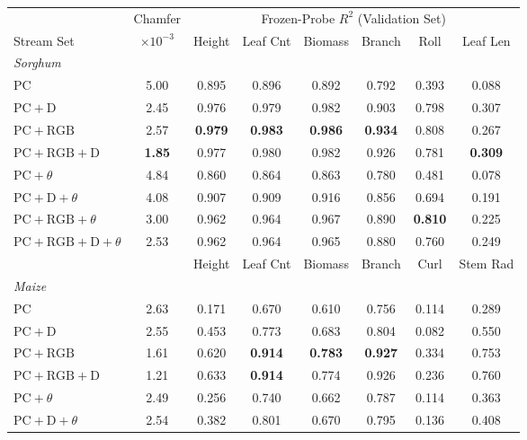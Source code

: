 \begin{table}[t]
  \centering\scriptsize
  \setlength{\tabcolsep}{3.2pt}
  \begin{tabular}{l c cccccc}
    \toprule
    & Chamfer & \multicolumn{6}{c}{Frozen-Probe $R^2$ (Validation Set)} \\
    \cmidrule(lr){3-8}
    Stream Set & $\times10^{-3}$ & Height & Leaf Cnt & Biomass & Branch & Roll & Leaf Len \\
    \midrule
    \multicolumn{8}{l}{\emph{Sorghum}} \\
    PC & 5.00 & 0.895 & 0.896 & 0.892 & 0.792 & 0.393 & 0.088 \\
    $\mathrm{PC}+\mathrm{D}$ & 2.45 & 0.976 & 0.979 & 0.982 & 0.903 & 0.798 & 0.307 \\
    $\mathrm{PC}+\mathrm{RGB}$ & 2.57 & \textbf{0.979} & \textbf{0.983} & \textbf{0.986} & \textbf{0.934} & 0.808 & 0.267 \\
    $\mathrm{PC}+\mathrm{RGB}+\mathrm{D}$ & \textbf{1.85} & 0.977 & 0.980 & 0.982 & 0.926 & 0.781 & \textbf{0.309} \\
    $\mathrm{PC}+\theta$ & 4.84 & 0.860 & 0.864 & 0.863 & 0.780 & 0.481 & 0.078 \\
    $\mathrm{PC}+\mathrm{D}+\theta$ & 4.08 & 0.907 & 0.909 & 0.916 & 0.856 & 0.694 & 0.191 \\
    $\mathrm{PC}+\mathrm{RGB}+\theta$ & 3.00 & 0.962 & 0.964 & 0.967 & 0.890 & \textbf{0.810} & 0.225 \\
    $\mathrm{PC}+\mathrm{RGB}+\mathrm{D}+\theta$ & 2.53 & 0.962 & 0.964 & 0.965 & 0.880 & 0.760 & 0.249 \\
    \midrule
    & & Height & Leaf Cnt & Biomass & Branch & Curl & Stem Rad \\
    \multicolumn{8}{l}{\emph{Maize}} \\
    PC & 2.63 & 0.171 & 0.670 & 0.610 & 0.756 & 0.114 & 0.289 \\
    $\mathrm{PC}+\mathrm{D}$ & 2.55 & 0.453 & 0.773 & 0.683 & 0.804 & 0.082 & 0.550 \\
    $\mathrm{PC}+\mathrm{RGB}$ & 1.61 & 0.620 & \textbf{0.914} & \textbf{0.783} & \textbf{0.927} & 0.334 & 0.753 \\
    $\mathrm{PC}+\mathrm{RGB}+\mathrm{D}$ & 1.21 & 0.633 & \textbf{0.914} & 0.774 & 0.926 & 0.236 & 0.760 \\
    $\mathrm{PC}+\theta$ & 2.49 & 0.256 & 0.740 & 0.662 & 0.787 & 0.114 & 0.363 \\
    $\mathrm{PC}+\mathrm{D}+\theta$ & 2.54 & 0.382 & 0.801 & 0.670 & 0.795 & 0.136 & 0.408 \\

\end{tabular}
\end{table}
